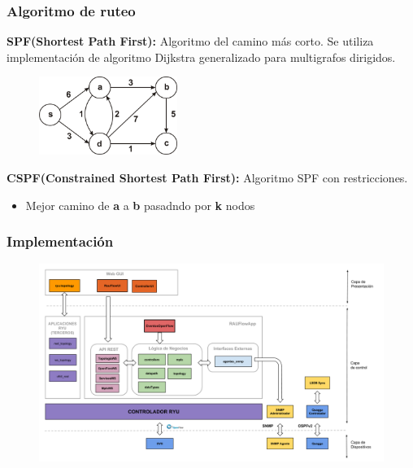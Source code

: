 \documentclass{beamer}
\begin{document}
\begin{frame}
\frametitle{Algoritmo de ruteo} 

\textbf{SPF(Shortest Path First):} Algoritmo del camino m\'as corto. Se utiliza implementaci\'on de algoritmo Dijkstra generalizado para multigrafos dirigidos.

\begin{figure}[H]
\centering
\includegraphics[width=0.4\textwidth]{imagenes/dijkstra.jpg}
\end{figure}


\textbf{CSPF(Constrained Shortest Path First):} Algoritmo SPF con restricciones.
\begin{itemize}
\item Mejor camino de \textbf{a} a \textbf{b} pasadndo por \textbf{k} nodos 
\end{itemize}

\end{frame}

\begin{frame}
\frametitle{Implementaci\'on} 

\begin{figure}[H]
\centering
\includegraphics[width=1.0\textwidth]{imagenes/rauflowarquitectura.png}
\end{figure}

\end{frame}

\end{document}
